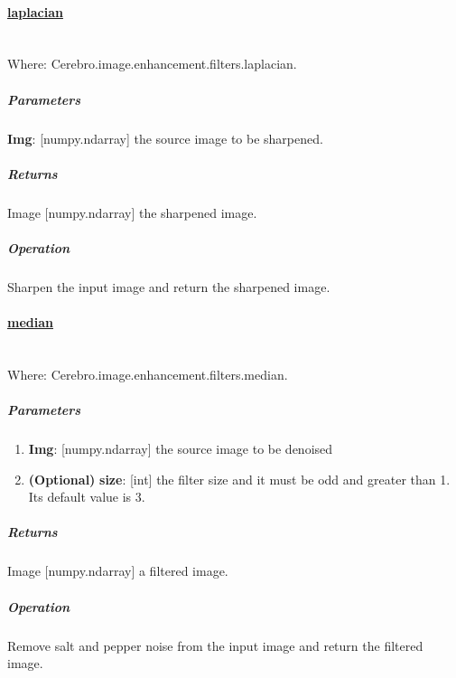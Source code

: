 \paragraph{\underline{laplacian}} \mbox{} \\
Where: Cerebro.image.enhancement.filters.laplacian.
\subparagraph{Parameters}
\begin{changemargin}{1cm}{0cm}
	\textbf{Img}: [numpy.ndarray] the source image to be sharpened.
\end{changemargin}

\subparagraph{Returns}
\begin{changemargin}{1cm}{0cm}
	Image [numpy.ndarray] the sharpened image.
\end{changemargin}

\subparagraph{Operation}
\begin{changemargin}{1cm}{0cm}
	Sharpen the input image and return the sharpened image.
\end{changemargin}

\newpage

\paragraph{\underline{median}} \mbox{} \\
Where: Cerebro.image.enhancement.filters.median.
\subparagraph{Parameters}
\begin{changemargin}{0.5cm}{0cm}
	\begin{enumerate}
		\item \textbf{Img}: [numpy.ndarray] the source image to be denoised
		\item \textbf{(Optional)} \textbf{size}: [int] the filter size and it must be odd and greater than 1. Its default value is 3.
	\end{enumerate}
\end{changemargin}

\subparagraph{Returns}
\begin{changemargin}{1cm}{0cm}
	Image [numpy.ndarray] a filtered image.
\end{changemargin}

\subparagraph{Operation}
\begin{changemargin}{1cm}{0cm}
 	Remove salt and pepper noise from the input image and return the filtered image.
\end{changemargin}

